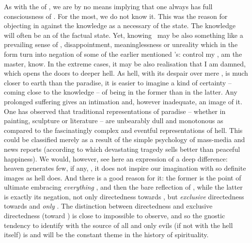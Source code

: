 As with the  of \yes, we are by no
  means implying that one always has full consciousness of \No.  For the most,
  we  do not know it.  This was the reason for objecting in
   against the  knowledge as a necessary 
  of the  state.  The  knowledge will often be an
   of the factual state. Yet, 
 knowing \No\ may be also something like a prevailing sense of
, disappointment, meaninglessness or unreality which in the
 form turn into negation of some of the earlier mentioned
's:  control my ,  am the master, 
know. In the extreme cases, it may be also  realisation that I am
damned, which opens the doors to deeper hell. As hell, with its despair over
mere , is much closer to earth than the  paradise,
it is easier to imagine a kind of certainty -- coming close to the 
knowledge -- of being in the former than in the latter. Any prolonged suffering
gives an intimation and, however inadequate, an image of it.  One has observed
that traditional representations of paradise -- whether in painting, sculpture
or literature -- are unbearably dull and monotonous as compared to the
fascinatingly complex and eventful representations of hell.  This could be
classified merely as a result of the simple psychology of mass-media and news
reports (according to which devastating tragedy sells better than peaceful
happiness). We would, however, see here an expression of a deep difference:
heaven generates few, if any, , it does not inspire our
imagination with so definite images as hell does. And there is a good reason for
it: the former is the point of ultimate  embracing {\em
  everything} 
, and then the bare reflection of , while the latter
is exactly its negation, not only directedness towards , but
{\em exclusive} directedness towards  and {\em only}
. The distinction between directedness and exclusive directedness
(toward ) is close to impossible to observe, and so the gnostic 
tendency to identify  with the source of all and only evils (if
not with the hell itself) is and will be the constant theme in the history of
spirituality.

